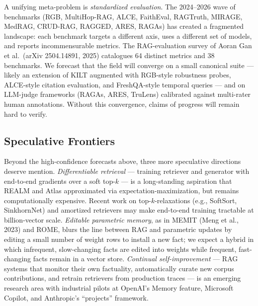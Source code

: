 A unifying meta-problem is \emph{standardized evaluation}. The 2024--2026 wave of benchmarks (RGB, MultiHop-RAG, ALCE, FaithEval, RAGTruth, MIRAGE, MedRAG, CRUD-RAG, RAGGED, ARES, RAGAs) has created a fragmented landscape: each benchmark targets a different axis, uses a different set of models, and reports incommensurable metrics. The RAG-evaluation survey of Aoran Gan et al.~(arXiv 2504.14891, 2025) catalogues 64 distinct metrics and 38 benchmarks. We forecast that the field will converge on a small canonical suite --- likely an extension of KILT augmented with RGB-style robustness probes, ALCE-style citation evaluation, and FreshQA-style temporal queries --- and on LLM-judge frameworks (RAGAs, ARES, TruLens) calibrated against multi-rater human annotations. Without this convergence, claims of progress will remain hard to verify.

\subsection{Speculative Frontiers}\label{speculative-frontiers}

Beyond the high-confidence forecasts above, three more speculative directions deserve mention. \emph{Differentiable retrieval} --- training retriever and generator with end-to-end gradients over a soft top-\(k\) --- is a long-standing aspiration that REALM and Atlas approximated via expectation-maximization, but remains computationally expensive. Recent work on top-\(k\)-relaxations (e.g., SoftSort, SinkhornNet) and amortized retrievers may make end-to-end training tractable at billion-vector scale. \emph{Editable parametric memory}, as in MEMIT (Meng et al., 2023) and ROME, blurs the line between RAG and parametric updates by editing a small number of weight rows to install a new fact; we expect a hybrid in which infrequent, slow-changing facts are edited into weights while frequent, fast-changing facts remain in a vector store. \emph{Continual self-improvement} --- RAG systems that monitor their own factuality, automatically curate new corpus contributions, and retrain retrievers from production traces --- is an emerging research area with industrial pilots at OpenAI's Memory feature, Microsoft Copilot, and Anthropic's ``projects'' framework.

